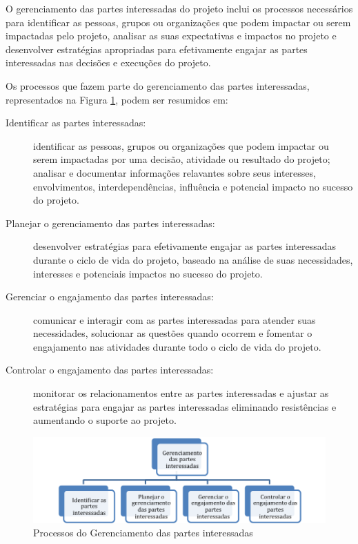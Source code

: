 


O gerenciamento das partes interessadas do projeto inclui os processos necessários para identificar as pessoas, grupos ou organizações que podem impactar ou serem impactadas pelo projeto, analisar as suas expectativas e impactos no projeto e desenvolver estratégias apropriadas para efetivamente engajar as partes interessadas nas decisões e execuções do projeto.

Os processos que fazem parte do gerenciamento das partes interessadas, representados na Figura \ref{fig:proc:ger:stakeholders}, podem ser resumidos em:

\begin{description}

	\item[Identificar as partes interessadas:] identificar as pessoas, grupos ou organizações que podem impactar ou serem impactadas por uma decisão, atividade ou resultado do projeto; analisar e documentar informações relavantes sobre seus interesses, envolvimentos, interdependências, influência e potencial impacto no sucesso do projeto.
	
	\item[Planejar o gerenciamento das partes interessadas:] desenvolver estratégias para efetivamente engajar as partes interessadas durante o ciclo de vida do projeto, baseado na análise de suas necessidades, interesses e potenciais impactos no sucesso do projeto.
	
	\item[Gerenciar o engajamento das partes interessadas:] comunicar e interagir com as partes interessadas para atender suas necessidades, solucionar as questões quando ocorrem e fomentar o engajamento nas atividades durante todo o ciclo de vida do projeto.
	
	\item[Controlar o engajamento das partes interessadas:] monitorar os relacionamentos entre as partes interessadas e ajustar as estratégias para engajar as partes interessadas eliminando resistências e aumentando o suporte ao projeto.

\end{description}

\begin{figure}[!h]
	\centering
	\includegraphics[scale=0.75]{Figuras/gerenciamento_stakeholders.png}
	\caption{Processos do Gerenciamento das partes interessadas}
	\label{fig:proc:ger:stakeholders}
\end{figure}

